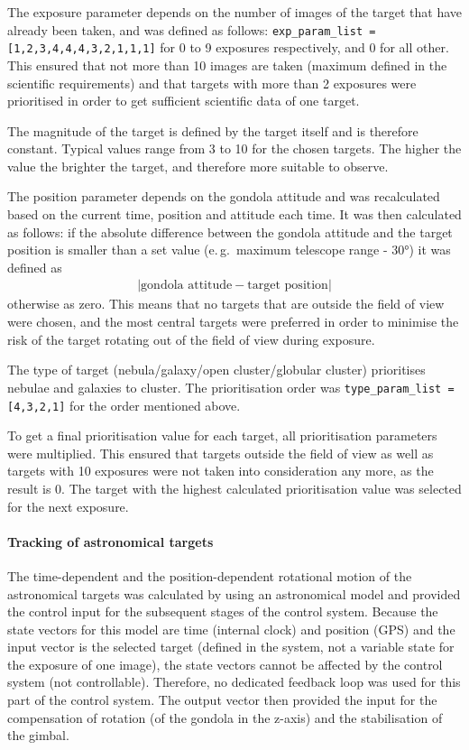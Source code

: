 The exposure parameter depends on the number of images of the target that have already been taken, and was defined as follows: \texttt{exp\_param\_list = [1,2,3,4,4,4,3,2,1,1,1]} for 0 to 9 exposures respectively, and 0 for all other. This ensured that not more than 10 images are taken (maximum defined in the scientific requirements) and that targets with more than 2 exposures were prioritised in order to get sufficient scientific data of one target.

The magnitude of the target is defined by the target itself and is therefore constant. Typical values range from 3 to 10 for the chosen targets. The higher the value the brighter the target, and therefore more suitable to observe.

The position parameter depends on the gondola attitude and was recalculated based on the current time, position and attitude each time. It was then calculated as follows: if the absolute difference between the gondola attitude and the target position is smaller than a set value (e.\,g.~maximum telescope range - $\ang{30}$) it was defined as 
\begin{align*}
    \left|\text{gondola attitude} - \text{target position} \right|
\end{align*}
otherwise as zero. This means that no targets that are outside the field of view were chosen, and the most central targets were preferred in order to minimise the risk of the target rotating out of the field of view during exposure.

The type of target (nebula/galaxy/open cluster/globular cluster) prioritises nebulae and galaxies to cluster. The prioritisation order was \texttt{type\_param\_list = [4,3,2,1]} for the order mentioned above.

To get a final prioritisation value for each target, all prioritisation parameters were multiplied. This ensured that targets outside the field of view as well as targets with 10 exposures were not taken into consideration any more, as the result is 0. The target with the highest calculated prioritisation value was selected for the next exposure.



\paragraph{Tracking of astronomical targets}

The time-dependent and the position-dependent rotational motion of the astronomical targets was calculated by using an astronomical model and provided the control input for the subsequent stages of the control system. Because the state vectors for this model are time (internal clock) and position (GPS) and the input vector is the selected target (defined in the system, not a variable state for the exposure of one image), the state vectors cannot be affected by the control system (not controllable). Therefore, no dedicated feedback loop was used for this part of the control system. The output vector then provided the input for the compensation of rotation (of the gondola in the z-axis) and the stabilisation of the gimbal.

